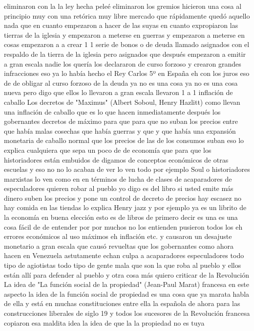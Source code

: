 eliminaron con la la ley hecha peleé eliminaron los gremios hicieron una cosa al principio muy con una retórica
muy libre mercado que rápidamente quedó aquello nada que en cuanto empezaron a hacer de las suyas en cuanto expropiaron las tierras de la iglesia
y empezaron a meterse en guerras y empezaron a meterse en cosas empezaron a a crear 1 1 serie de bonos o de deuda
llamado asignados con el respaldo de la tierra de la iglesia pero asignados que después
empezaron a emitir a gran escala nadie los quería los declararon de curso forzoso y crearon grandes infracciones
eso ya lo había hecho el Rey Carlos 5º en España eh con los juros eso de de obligar al curso forzoso de la deuda
ya no es una cosa ya no es una cosa nueva pero digo que ellos lo llevaron a gran escala llevaron 1 a 1 inflación de caballo
Los decretos de "Maximus" (Albert Soboul, Henry Hazlitt)
como llevan una inflación de caballo que es lo que hacen inmediatamente después los gobernantes decretos de máximo para que para que no suban los precios
entre que había malas cosechas que había guerras y que y que había una expansión monetaria de caballo normal que los precios de las de los consumos suban
eso lo explica cualquiera que sepa un poco de de economía que para que los historiadores están embuidos de digamos de conceptos económicos de otras escuelas
y eso no no lo acaban de ver lo ven todo por ejemplo Soul o historiadores marxistas lo ven como en en términos de lucha de clases
de acaparadores de especuladores quieren robar al pueblo yo digo es del libro si usted emite más dinero
suben los precios y pone un control de decreto de precios hay escasez no hay comida en las tiendas lo explica Henry jazz
y por ejemplo ya es un librito de la economía en buena elección esto es de libros de primero decir es una
es una cosa fácil de de entender por por muchos no los entienden pusieron todos los eh errores económicos
al uso máximos eh inflación etc. y causaron un desajuste monetario a gran escala
que causó revueltas que los gobernantes como ahora hacen en Venezuela
astutamente echan culpa a acaparadores especuladores todo tipo de agiotistas todo tipo de gente mala
que son la que roba al pueblo y ellos están allí para defender al pueblo y otra cosa más quiero criticar de la Revolución
La idea de "La función social de la propiedad" (Jean-Paul Marat)
francesa en este aspecto la idea de la función social de propiedad
es una cosa que ya marata habla de ella y está en muchas constituciones entre ella la española de ahora para las construcciones liberales de siglo 19
y todos los sucesores de la Revolución francesa copiaron esa maldita idea la idea de que la la propiedad no es tuya
